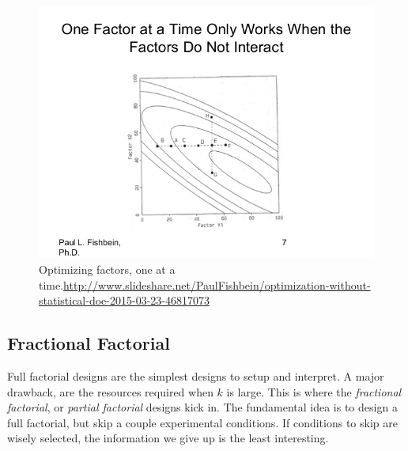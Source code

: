 \begin{figure}[ht]
\centering
\includegraphics[height=0.3\textheight]{art/optimization-without-statistical-doe-2015-03-23-7-638}
\caption[One-at-a-time optimization]{Optimizing factors, one at a time.\newline \url{http://www.slideshare.net/PaulFishbein/optimization-without-statistical-doe-2015-03-23-46817073}}
\label{fig:one_factor_at_a_time}
\end{figure}





\subsection{Fractional Factorial}
Full factorial designs are the simplest designs to setup and interpret. 
A major drawback, are the resources required when $k$ is large. 
This is where the \emph{fractional factorial}, or \emph{partial factorial} designs kick in.
The fundamental idea is to design a full factorial, but skip a couple experimental conditions. 
If conditions to skip are wisely selected, the information we give up is the least interesting. 


